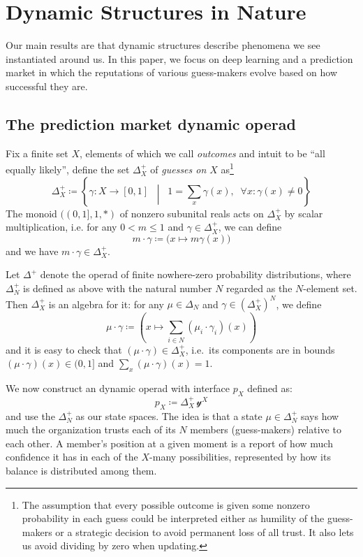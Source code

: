 \documentclass[11pt, one side, article]{memoir}
\theoremstyle{definition}
\theoremstyle{plain}
\newcommand{\yon}{\mathcal{y}}
\newcommand{\0}{\textsf{0}}
\newcommand{\1}{\tn{\textsf{1}}}
\newcommand{\bet}{\Delta^+}
\begin{document}
\chapter{Dynamic Structures in Nature}
%

Our main results are that dynamic structures describe phenomena we see instantiated around us. In this paper, we focus on deep learning and a prediction market in which the reputations of various guess-makers evolve based on how successful they are.


\section{The prediction market dynamic operad}\label{sec.kelley}


Fix a finite set $X$, elements of which we call \emph{outcomes} and intuit to be ``all equally likely'', define the set $\bet_X$ of \emph{guesses on $X$} as\footnote{The assumption that every possible outcome is given some nonzero probability in each guess could be interpreted either as humility of the guess-makers or a strategic decision to avoid permanent loss of all trust. It also lets us avoid dividing by zero when updating.}
\[
	\bet_X\coloneqq\left\{\gamma\colon X\to[0,1]\;\;\middle|\;\;1=\sum_x\gamma(x), \;\; \forall x\colon \gamma(x) \neq 0 \right\}
\]
The monoid $((0,1],1,*)$ of nonzero subunital reals acts on $\bet_X$ by scalar multiplication, i.e. for any $0 < m\leq 1$ and $\gamma\in\bet_X$, we can define
\[
	m\cdot \gamma\coloneqq \big(x\mapsto m\gamma (x)\big)
\]
and we have $m\cdot\gamma\in\bet_X$. 

Let $\Delta^+$ denote the operad of finite nowhere-zero probability distributions, where $\Delta^+_N$ is defined as above with the natural number $N$ regarded as the $N$-element set. %
Then $\bet_X$ is an algebra for it: for any $\mu\in\Delta_N$ and $\gamma \in (\bet_X)^N$, we define 
\[
	\mu\cdot\gamma\coloneqq\left(x\mapsto\sum_{i\in N}(\mu_i\cdot\gamma_i)(x)\right)
\]
and it is easy to check that $(\mu\cdot\gamma)\in\bet_X$, i.e.\ its components are in bounds $(\mu\cdot\gamma)(x)\in (0,1]$ and $\sum_x(\mu\cdot\gamma)(x)=1$.

We now construct an dynamic operad with interface $p_X$ defined as:
\[
p_X\coloneqq \bet_X\,\yon^X
\]
and use the $\Delta^+_N$ as our state spaces. The idea is that a state $\mu\in\Delta^+_N$ says how much the organization trusts each of its $N$ members (guess-makers) relative to each other. A member's position at a given moment is a report of how much confidence it has in each of the $X$-many possibilities, represented by how its balance is distributed among them.
\end{document}
